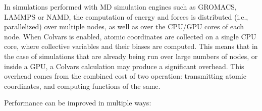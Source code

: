 
In simulations performed with MD simulation engines such as GROMACS, LAMMPS or NAMD, the computation of energy and forces is distributed (i.e., parallelized) over multiple nodes, as well as over the CPU/GPU cores of each node.
When Colvars is enabled, atomic coordinates are collected on a single CPU core, where collective variables and their biases are computed.
This means that in the case of simulations that are already being run over large numbers of nodes, or inside a GPU, a Colvars calculation may produce a significant overhead.
This overhead comes from the combined cost of two operation: transmitting atomic coordinates, and computing functions of the same.

Performance can be improved in multiple ways:

